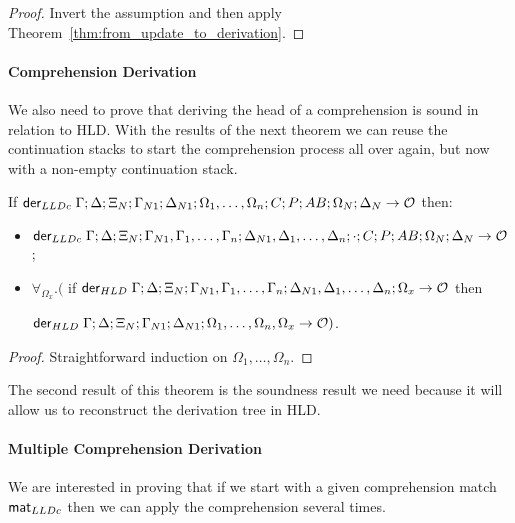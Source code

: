 \begin{proof}
Invert the assumption and then apply Theorem~\ref{thm:from_update_to_derivation}.
\end{proof}


\paragraph{Comprehension Derivation}

We also need to prove that deriving the head of a comprehension is sound in
relation to HLD.  With the results of the next theorem we can reuse the
continuation stacks to start the comprehension process all over again, but now
with a non-empty continuation stack.

\begin{theorem}\label{thm:comprehension_derivation}
If $\mathsf{der}_{LLDc} \; \Gamma; \Delta; \Xi_N; \Gamma_{N1}; \Delta_{N1}; \Omega_1, \dotsc, \Omega_n; C; P;
AB; \Omega_N; \Delta_N \rightarrow \mathcal{O}$ then:

\begin{itemize}[leftmargin=*]
   \item $\mathsf{der}_{LLDc} \; \Gamma; \Delta; \Xi_N; \Gamma_{N1}, \Gamma_1, \dotsc, \Gamma_n; \Delta_{N1},
   \Delta_1, \dotsc, \Delta_n; \cdot; C; P; AB; \Omega_N; \Delta_N \rightarrow
   \mathcal{O}$;

   \item $\forall_{\Omega_x}.($ if $\mathsf{der}_{HLD} \; \Gamma; \Delta; \Xi_N;
   \Gamma_{N1}, \Gamma_1, \dotsc, \Gamma_n; \Delta_{N1}, \Delta_1, \dotsc,
   \Delta_n; \Omega_x \rightarrow \mathcal{O}$ then

   $\mathsf{der}_{HLD} \; \Gamma; \Delta; \Xi_N; \Gamma_{N1}; \Delta_{N1}; \Omega_1, \dotsc,
   \Omega_n, \Omega_x \rightarrow \mathcal{O})$.

\end{itemize}
\end{theorem}

\begin{proof}
Straightforward induction on $\Omega_1, \dotsc, \Omega_n$.
\end{proof}

The second result of this theorem is the soundness result we need because it will allow us to reconstruct the derivation tree in HLD.


\paragraph{Multiple Comprehension Derivation} We are interested in proving that
if we start with a given comprehension match $\mathsf{mat}_{LLDc}$ then we can apply the
comprehension several times.

